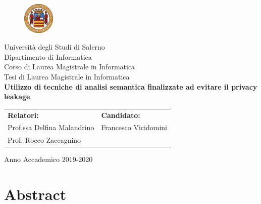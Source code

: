 \documentclass[14pt]{extreport}
\begin{document}
\begin{titlepage}
\begin{center}
	\begin{figure}
    	\includegraphics[width=1.5cm, height=1.5cm]{unisa.png}
    	\centering
    \end{figure}
	{\Large Università degli Studi di Salerno}\\[0.2truecm]
	{\large Dipartimento di Informatica\\Corso di Laurea Magistrale in Informatica}\\
	\hrulefill
	\vfill
	{\large Tesi di Laurea Magistrale in Informatica}\\[0.2truecm]
	\vfill\vfill
	{\LARGE {\bf Utilizzo di tecniche di analisi semantica finalizzate ad evitare il privacy leakage}}
	
	\vfill\vfill
	\begin{table}[h]
    \centering
    \begin{tabular}{p{10cm}p{5cm}}
    \textbf{Relatori:} & \textbf{Candidato:} \\
    Prof.ssa Delfina Malandrino & Francesco Vicidomini \\
    Prof. Rocco Zaccagnino & \multicolumn{1}{l}{}
    \end{tabular}
    \end{table}
	
	
	\vfill
	\hrulefill 
	\begin{center} Anno Accademico 2019-2020 \end{center}
	
\end{center}
\end{titlepage}

\setcounter{page}{1} 		

\newpage
	
\tableofcontents




\chapter*{Abstract}
 
\end{document}
